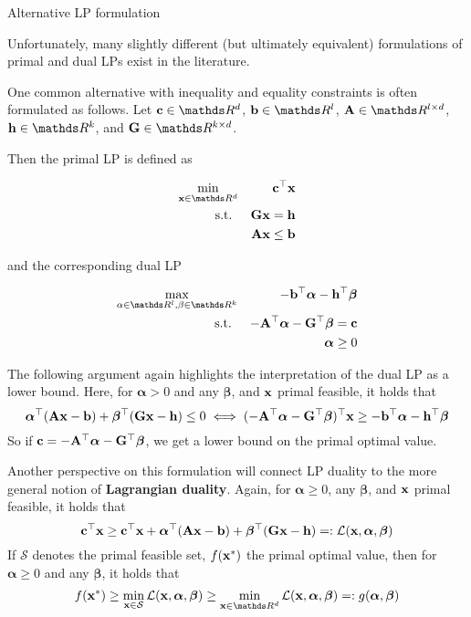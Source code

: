 \documentclass[11pt,compress,t,notes=noshow, xcolor=table]{beamer}
\begin{document}
\begin{vbframe}{Alternative LP formulation}

Unfortunately, many slightly different (but ultimately equivalent) formulations of primal and dual LPs exist in the literature. 

One common alternative with inequality and equality constraints is often formulated as
follows. Let $\mathbf{c} \in \R^d$, $\mathbf{b} \in \R^l$, $\Amat \in \R^{l \times d}$, $\mathbf{h} \in \R^k$, and $\mathbf{G} \in \R^{k \times d}$.

Then the primal LP is defined as 

\begin{eqnarray*}
    \min_{\xv \in \R^d} && \mathbf{c}^\top\xv \\
    \text{s.t. } && \mathbf{G} \xv = \mathbf{h} \\
                 && \Amat \xv \le \mathbf{b} 
\end{eqnarray*}

\framebreak

and the corresponding dual LP 

\begin{eqnarray*}
 \max_{\alpha \in \R^l, \beta \in \R^k} && -\mathbf{b}^\top\bm{\alpha} -\mathbf{h}^\top\bm{\beta} \\
\text{s.t. } && -\Amat^\top \bm{\alpha} - \mathbf{G}^\top \bm{\beta} = \mathbf{c}\\
             && \bm{\alpha} \ge 0 
\end{eqnarray*}

The following argument again highlights the interpretation of the dual
LP as a lower bound.
Here, for $\bm{\alpha}>0$ and any $\bm{\beta}$, and $\mathbf{x}$ primal feasible, it holds that 
$$
    \bm{\alpha}^\top (\mathbf{A} \mathbf{x} - \mathbf{b}) + \bm{\beta}^\top (\mathbf{G} \mathbf{x} - \mathbf{h}) \le 0
    \iff (-\mathbf{A}^\top \bm{\alpha} - \mathbf{G}^\top \bm{\beta})^\top \mathbf{x} \geq -\mathbf{b}^\top \bm{\alpha} - \mathbf{h}^\top \bm{\beta}
$$
So if $\mathbf{c} = -\mathbf{A}^\top \bm{\alpha} - \mathbf{G}^\top \bm{\beta}$, we get a lower bound on the
primal optimal value.

\framebreak

Another perspective on this formulation will connect LP duality to the more general notion of \textbf{Lagrangian duality}.
Again, for $\bm{\alpha} \geq 0$, any $\bm{\beta}$, and $\mathbf{x}$ primal feasible, it holds that
$$
\mathbf{c}^\top \mathbf{x} \ge \mathbf{c}^\top \mathbf{x} + \bm{\alpha}^\top (\mathbf{A} \mathbf{x} - \mathbf{b}) + \bm{\beta}^\top (\mathbf{G} \mathbf{x} - \mathbf{h}) =: \mathcal{L}(\mathbf{x},\bm{\alpha},\bm{\beta})
$$
If $\mathcal{S}$ denotes the primal feasible set, $f(\mathbf{x}^*)$ the primal optimal value, then for $\bm{\alpha} \geq 0$ and any $\bm{\beta}$, it holds that
$$
    f(\xv^*) \ge \min_{\xv \in \mathcal{S}}\mathcal{L}(\xv,\bm{\alpha},\bm{\beta}) \ge \min_{\xv \in \R^d} \mathcal{L}(\xv,\bm{\alpha},\bm{\beta}) =: g(\bm{\alpha},\bm{\beta})
$$


\end{vbframe}
\end{document}
